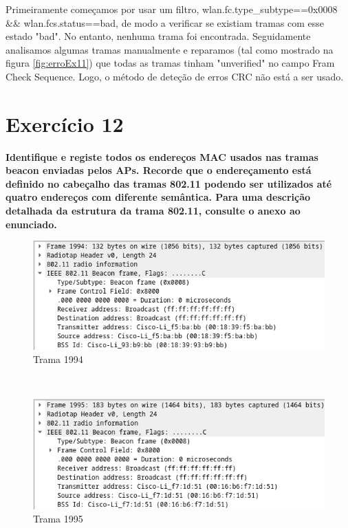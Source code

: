 \documentclass[a4paper]{report}
\begin{document}
Primeiramente começamos por usar um filtro, wlan.fc.type_subtype==0x0008 &&
wlan.fcs.status==bad, de modo a verificar se existiam tramas com esse estado
"bad". No entanto, nenhuma trama foi encontrada. Seguidamente analisamos algumas
tramas manualmente e reparamos (tal como mostrado na figura \ref{fig:erroEx11})
que todas as tramas tinham "unverified" no campo Fram Check Sequence. Logo, o
método de deteção de erros CRC não está a ser usado.

\section{Exercício 12}
\textbf{Identifique e registe todos os endereços MAC usados nas tramas beacon
    enviadas pelos APs. Recorde que o endereçamento está definido no cabeçalho
    das tramas 802.11 podendo ser utilizados até quatro endereços com diferente
    semântica. Para uma descrição detalhada da estrutura da trama 802.11,
    consulte o anexo ao enunciado.}\\

\begin{figure}[H]
    \centering 
    \includegraphics[width=\textwidth]{images/trama1994Ex12.png}  
    \caption{Trama 1994}
    \label{fig:trama1994Ex12}
\end{figure}\\

\begin{figure}[H]
    \centering 
    \includegraphics[width=\textwidth]{images/trama1995Ex12.png}  
    \caption{Trama 1995}
    \label{fig:trama1995Ex12}
\end{figure}\\
\end{document}
